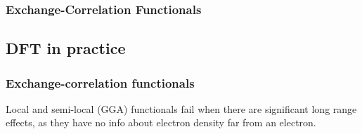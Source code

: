 \subsubsection{Exchange-Correlation Functionals}








\subsection{DFT in practice}

\subsubsection{Exchange-correlation functionals}


Local and semi-local (GGA) functionals fail when there are significant long range effects, as they have no info about electron density far from an electron.






